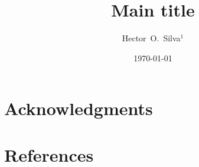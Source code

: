 \documentclass[12pt]{iopart}
\begin{document}
\title[Mini-title]{\sc Main title}

\author{\sc
Hector~O.~Silva$^{1}$
}

\address{$^{1}$~Max Planck Institute for Gravitational Physics (Albert Einstein Institute),
Am M\"uhlenberg 1, 14476 Potsdam, Germany}

\date{\today}

\begin{abstract}
\end{abstract}

\maketitle


\section*{Acknowledgments}


\section*{References}


\end{document}
